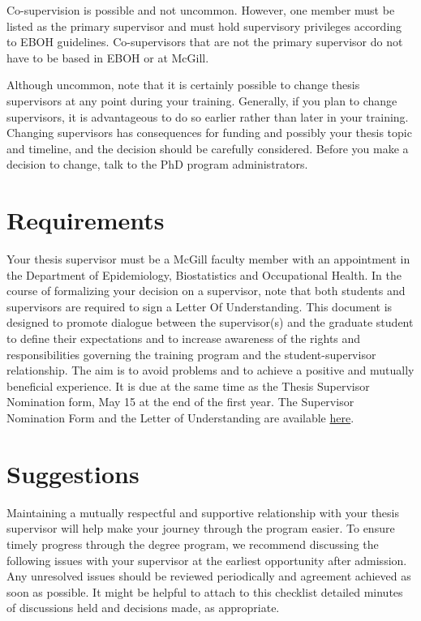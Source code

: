 \documentclass[
  letterpaper,
  DIV=11,
  numbers=noendperiod]{scrreprt}
\begin{document}
Co-supervision is possible and not uncommon. However, one member must be
listed as the primary supervisor and must hold supervisory privileges
according to EBOH guidelines. Co-supervisors that are not the primary
supervisor do not have to be based in EBOH or at McGill.

Although uncommon, note that it is certainly possible to change thesis
supervisors at any point during your training. Generally, if you plan to
change supervisors, it is advantageous to do so earlier rather than
later in your training. Changing supervisors has consequences for
funding and possibly your thesis topic and timeline, and the decision
should be carefully considered. Before you make a decision to change,
talk to the PhD program administrators.

\section{Requirements}\label{requirements}

Your thesis supervisor must be a McGill faculty member with an
appointment in the Department of Epidemiology, Biostatistics and
Occupational Health. In the course of formalizing your decision on a
supervisor, note that both students and supervisors are required to sign
a Letter Of Understanding. This document is designed to promote dialogue
between the supervisor(s) and the graduate student to define their
expectations and to increase awareness of the rights and
responsibilities governing the training program and the
student-supervisor relationship. The aim is to avoid problems and to
achieve a positive and mutually beneficial experience. It is due at the
same time as the Thesis Supervisor Nomination form, May 15 at the end of
the first year. The Supervisor Nomination Form and the Letter of
Understanding are available
\href{https://www.mcgill.ca/epi-biostat-occh/files/epi-biostat-occh/eboh_supervisor_nomination_form-lou_201909.docx}{here}.

\section{Suggestions}\label{suggestions}

Maintaining a mutually respectful and supportive relationship with your
thesis supervisor will help make your journey through the program
easier. To ensure timely progress through the degree program, we
recommend discussing the following issues with your supervisor at the
earliest opportunity after admission. Any unresolved issues should be
reviewed periodically and agreement achieved as soon as possible. It
might be helpful to attach to this checklist detailed minutes of
discussions held and decisions made, as appropriate.
\end{document}
